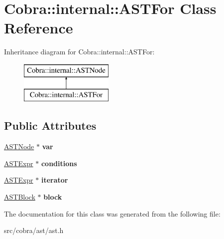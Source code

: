 \hypertarget{class_cobra_1_1internal_1_1_a_s_t_for}{\section{Cobra\+:\+:internal\+:\+:A\+S\+T\+For Class Reference}
\label{class_cobra_1_1internal_1_1_a_s_t_for}
}
Inheritance diagram for Cobra\+:\+:internal\+:\+:A\+S\+T\+For\+:\begin{figure}[H]
\begin{center}
\leavevmode
\includegraphics[height=2.000000cm]{class_cobra_1_1internal_1_1_a_s_t_for}
\end{center}
\end{figure}
\subsection*{Public Attributes}
\begin{DoxyCompactItemize}
\item 
\hypertarget{class_cobra_1_1internal_1_1_a_s_t_for_a61962164f3d93fc5d680090b056ff8b7}{\hyperlink{class_cobra_1_1internal_1_1_a_s_t_node}{A\+S\+T\+Node} $\ast$ {\bfseries var}}\label{class_cobra_1_1internal_1_1_a_s_t_for_a61962164f3d93fc5d680090b056ff8b7}

\item 
\hypertarget{class_cobra_1_1internal_1_1_a_s_t_for_ae895f2e05ca9372a84c5ddeb75742386}{\hyperlink{class_cobra_1_1internal_1_1_a_s_t_expr}{A\+S\+T\+Expr} $\ast$ {\bfseries conditions}}\label{class_cobra_1_1internal_1_1_a_s_t_for_ae895f2e05ca9372a84c5ddeb75742386}

\item 
\hypertarget{class_cobra_1_1internal_1_1_a_s_t_for_aabc648bff8efded5efdfeb4e386b40fa}{\hyperlink{class_cobra_1_1internal_1_1_a_s_t_expr}{A\+S\+T\+Expr} $\ast$ {\bfseries iterator}}\label{class_cobra_1_1internal_1_1_a_s_t_for_aabc648bff8efded5efdfeb4e386b40fa}

\item 
\hypertarget{class_cobra_1_1internal_1_1_a_s_t_for_a2e7a7694dc5527a8936305e70e7438ed}{\hyperlink{class_cobra_1_1internal_1_1_a_s_t_block}{A\+S\+T\+Block} $\ast$ {\bfseries block}}\label{class_cobra_1_1internal_1_1_a_s_t_for_a2e7a7694dc5527a8936305e70e7438ed}

\end{DoxyCompactItemize}


The documentation for this class was generated from the following file\+:\begin{DoxyCompactItemize}
\item 
src/cobra/ast/ast.\+h\end{DoxyCompactItemize}
